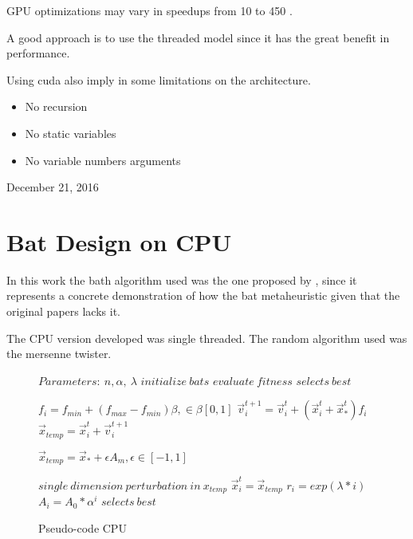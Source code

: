 \documentclass[conference]{IEEEtran}
\begin{document}
GPU optimizations may vary in speedups from 10 to 450 \cite{gpuOptimization}.

A good approach is to use the threaded model since it has the great benefit in performance.

Using cuda also imply in  some limitations on the architecture.

\begin{itemize}
\item No recursion
\item No static variables
\item No variable numbers arguments
\end{itemize}


\hfill December 21, 2016

\section{Bat Design on CPU}

In this work the bath algorithm used was the one proposed by
\cite{parpinelli}, since it represents a concrete demonstration of how
the bat metaheuristic given that the original papers lacks it.

The CPU version developed was single threaded.
The random algorithm used was the mersenne twister.

\begin{figure}
\begin{algorithmic}[1]
\State $Parameters:\ n,\alpha,\ \lambda$
\State $initialize\ bats$
\State $evaluate\ fitness$
\State $selects\ best$

        \State $f_i=f_{min} + (f_{max} - f_{min})\beta, \in \beta [0,1]$
        \State $\vec{v}_i^{t+1} = \vec{v}_i^{t} + (\vec{x}_i^{t} + \vec{x}_*^{t})f_i$
        \State $\vec{x}_{temp} = \vec{x}_i^{t} + \vec{v}_i^{t+1}$


            \State $\vec{x}_{temp} = \vec{x}_* + \epsilon A_m, \epsilon \in [-1, 1]$
        \EndIf

        \State $single\ dimension\ perturbation\ in\ x_{temp}$
            \State $\vec{x}_i^t = \vec{x}_{temp}$
            \State $r_i = exp(\lambda * i)$
            \State $A_i =  A_{0} * \alpha^i$
        \EndIf
        \State $selects\ best$
    \EndFor
\EndWhile
\end{algorithmic}
\caption{Pseudo-code CPU}\label{GPU}
\end{figure}
\end{document}
